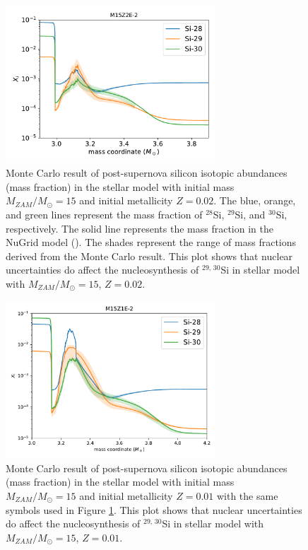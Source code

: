 \documentclass{brandeis-thesis3.2}
\def \msun {M_{\odot}}
\newcommand{\iso}[2]{$^{#1}${#2}}
\begin{document}
\begin{figure}[H]
    \centering
    \includegraphics[width=0.7\textwidth]{figs/M15Z2E-2_mcresult.pdf}
    \caption{Monte Carlo result of post-supernova silicon isotopic abundances (mass fraction) in the stellar model with initial mass $M_{ZAM}/\msun =15$ and initial metallicity $Z=0.02$. The blue, orange, and green lines represent the mass fraction of \iso{28}{Si}, \iso{29}{Si}, and \iso{30}{Si}, respectively. The solid line represents the mass fraction in the NuGrid model (\cite{Ritter_2018}). The shades represent the range of mass fractions derived from the Monte Carlo result. This plot shows that nuclear uncertainties do affect the nucleosynthesis of \iso{29,\, 30}{Si} in stellar model with $M_{ZAM}/\msun =15$, $Z=0.02$.}
    \label{fig:m15z02_region}
\end{figure}

\begin{figure}[H]
    \centering
    \includegraphics[width=0.7\textwidth]{figs/M15Z1E-2_mcresult.pdf}
    \caption{Monte Carlo result of post-supernova silicon isotopic abundances (mass fraction) in the stellar model with initial mass $M_{ZAM}/\msun =15$ and initial metallicity $Z=0.01$ with the same symbols used in Figure \ref{fig:m15z02_region}. This plot shows that nuclear uncertainties do affect the nucleosynthesis of \iso{29,\, 30}{Si} in stellar model with $M_{ZAM}/\msun =15$, $Z=0.01$.}
    \label{fig:m15z01_region}
\end{figure}
\end{document}
